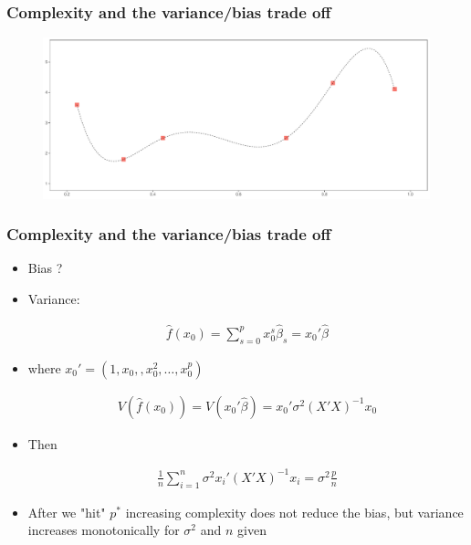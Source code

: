 \documentclass[
  shownotes,
  xcolor={svgnames},
  hyperref={colorlinks,citecolor=DarkBlue,linkcolor=DarkRed,urlcolor=DarkBlue}
  , aspectratio=169]{beamer}
\begin{document}
\begin{frame}
\frametitle{Complexity and the variance/bias trade off}


        \begin{figure}[H] \centering
            \captionsetup{justification=centering}
              \includegraphics[scale=0.4]{figures/fig_1f.pdf}
 \end{figure}

\end{frame}



\begin{frame}[fragile]
\frametitle{Complexity and the variance/bias trade off}


\begin{itemize}

  \item Bias ?
  \item Variance:


  \begin{align}
  \hat f(x_0) = \sum_{s=0}^p x_0^s\hat\beta_s = x_0'\hat\beta  
  \end{align}

 \item  where $x_0'=(1,x_0,,x_0^2,\dots,x_0^p)$

  \begin{align}
  V(\hat f(x_0) ) = V(x_0'\hat\beta) = x_0'\sigma^2(X'X)^{-1}x_0
  \end{align}

  \item Then 

  \begin{align}
\frac{1}{n}\sum_{i=1}^n\sigma^2 x_{i}'(X'X)^{-1}x_{i}= \sigma^2 \frac{p}{n}
\end{align}


\item After we "hit" $p^*$ increasing complexity does not reduce the bias, but variance increases monotonically for $\sigma^2$ and $n$ given
 
\end{itemize}

\end{frame}
\end{document}
